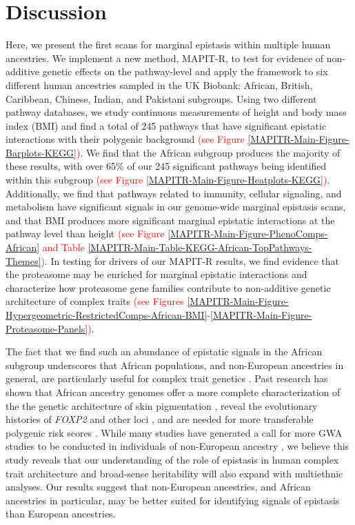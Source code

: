 \documentclass[10pt]{article}
\begin{document}

\section*{Discussion}\label{MAPITR-Discussion}

Here, we present the first scans for marginal epistasis within multiple human ancestries. We implement a new method, MAPIT-R, to test for evidence of non-additive genetic effects on the pathway-level and apply the framework to six different human ancestries sampled in the UK Biobank: African, British, Caribbean, Chinese, Indian, and Pakistani subgroups. Using two different pathway databases, we study continuous measurements of height and body mass index (BMI) and find a total of 245 pathways that have significant epistatic interactions with their polygenic background \textcolor{red}{(see Figure \ref{MAPITR-Main-Figure-Barplots-KEGG})}. We find that the African subgroup produces the majority of these results, with over 65\% of our 245 significant pathways being identified within this subgroup \textcolor{red}{(see Figure \ref{MAPITR-Main-Figure-Heatplots-KEGG})}. Additionally, we find that pathways related to immunity, cellular signaling, and metabolism have significant signals in our genome-wide marginal epistasis scans, and that BMI produces more significant marginal epistatic interactions at the pathway level than height \textcolor{red}{(see Figure \ref{MAPITR-Main-Figure-PhenoComps-African} and Table \ref{MAPITR-Main-Table-KEGG-African-TopPathways-Themes})}. In testing for drivers of our MAPIT-R results, we find evidence that the proteasome may be enriched for marginal epistatic interactions and characterize how proteasome gene families contribute to non-additive genetic architecture of complex traits \textcolor{red}{(see Figures \ref{MAPITR-Main-Figure-Hypergeometric-RestrictedComps-African-BMI}-\ref{MAPITR-Main-Figure-Proteasome-Panels})}. 

The fact that we find such an abundance of epistatic signals in the African subgroup underscores that African populations, and non-European ancestries in general, are particularly useful for complex trait genetics \cite{Dumitrescu2011,Rotimi2017,Choudhury2018,Martin2018,Mogil2018,Bien2019,Kuchenbaecker2019,Wojcik2019,Zhong2019,Bentley2020}. Past research has shown that African ancestry genomes offer a more complete characterization of the the genetic architecture of skin pigmentation \cite{Martin2017b,Crawford2017b}, reveal the evolutionary histories of \textit{FOXP2} and other loci \cite{Atkinson2018,Sugden2018}, and are needed for more transferable polygenic risk scores \cite{Duncan2019,Marnetto2020}. While many studies have generated a call for more GWA studies to be conducted in individuals of non-European ancestry  \cite{Need2009,Popejoy2016,Gurdasani2019,Martin2019,Sirugo2019}, we believe this study reveals that our understanding of the role of epistasis in human complex trait architecture and broad-sense heritability will also expand with multiethnic analyses. Our results suggest that non-European ancestries, and African ancestries in particular, may be better suited for identifying signals of epistasis than European ancestries. 
\end{document}
